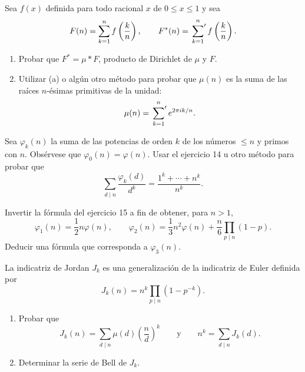 \documentclass[12pt,a4paper]{book}
\begin{document}
    \begin{ejercicio}
        Sea $f(x)$ definida para todo racional $x$ de $0\leq x\leq1$ y sea
        \begin{equation*}
            F(n)=\sum_{k=1}^{n}f\left(\frac{k}{n}\right),\qquad
            F^*(n)=\sideset{}{'}\sum_{k=1}^{n}f\left(\frac{k}{n}\right).
        \end{equation*}
        \begin{enumerate}
            \item[(a)] Probar que $F^*=\mu*F$, producto de Dirichlet de $\mu$ y $F$.
            \item[(b)] Utilizar (a) o algún otro método para probar que $\mu(n)$ es la suma
            de las raíces $n$-ésimas primitivas de la unidad:
            \begin{equation*}
                \mu(n)=\sideset{}{'}\sum_{k=1}^{n}e^{2\pi ik/n}.
            \end{equation*}
        \end{enumerate}
    \end{ejercicio}

    \begin{ejercicio}
        Sea $\varphi_k(n)$ la suma de las potencias de orden $k$ de los números $\leq n$ y
        primos con $n$. Obsérvese que $\varphi_0(n)=\varphi(n)$. Usar el ejercicio 14 u
        otro método para probar que
        \begin{equation*}
            \sum_{d\mid n}\frac{\varphi_k(d)}{d^k}=\frac{1^k+\cdots+n^k}{n^k}.
        \end{equation*}
    \end{ejercicio}

    \begin{ejercicio}
        Invertir la fórmula del ejercicio 15 a fin de obtener, para $n>1$,
        \begin{equation*}
            \varphi_1(n)=\frac{1}{2}n\varphi(n),\qquad
            \varphi_2(n)=\frac{1}{3}n^2\varphi(n)+\frac{n}{6}\prod_{p\mid n}(1-p).
        \end{equation*}
        Deducir una fórmula que corresponda a $\varphi_3(n)$.
    \end{ejercicio}

    \begin{ejercicio}
        La indicatriz de Jordan $J_k$ es una generalización de la indicatriz de Euler
        definida por
        \begin{equation*}
            J_k(n)=n^k\prod_{p\mid n}(1-p^{-k}).
        \end{equation*}
        \begin{enumerate}
            \item[(a)] Probar que
            \begin{equation*}
                J_k(n)=\sum_{d\mid n}\mu(d)\left(\frac{n}{d}\right)^k\qquad\text{y}\qquad
                n^k=\sum_{d\mid n}J_k(d).
            \end{equation*}
            \item[(b)] Determinar la serie de Bell de $J_k$.
        \end{enumerate}
    \end{ejercicio}
\end{document}

